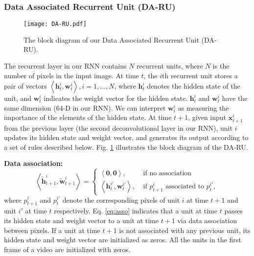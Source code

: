 \documentclass[conference]{IEEEtran}
\begin{document}
\subsubsection{Data Associated Recurrent Unit (DA-RU)}


\begin{figure}
	\centering
	\texttt{[image: DA-RU.pdf]}
	\caption{The block diagram of our Data Associated Recurrent Unit (DA-RU).}
	\label{fig:daru}
	\vspace{-4mm}
\end{figure}

The recurrent layer in our RNN contains $N$ recurrent units, where $N$ is the number of pixels in the input image. At time $t$, the $i$th recurrent unit stores a pair of vectors $\left< \mathbf{h}_t^i, \mathbf{w}_t^i \right>, i = 1,\ldots,N$, where $\mathbf{h}_t^i$ denotes the hidden state of the unit, and $\mathbf{w}_t^i$ indicates the weight vector for the hidden state. $\mathbf{h}_t^i$ and $\mathbf{w}_t^i$ have the same dimension (64-D in our RNN). We can interpret $\mathbf{w}_t^i$ as measuring the importance of the elements of the hidden state. At time $t + 1$, given input $\mathbf{x}_{t+1}^{i}$ from the previous layer (the second deconvolutional layer in our RNN), unit $i$ updates its hidden state and weight vector, and generates its output according to a set of rules described below. Fig. \ref{fig:daru} illustrates the block diagram of the DA-RU.

\textbf{Data association: }
\begin{equation} \label{eq:asso}
\left< \widetilde{\mathbf{h}}_{t+1}^{i}, \widetilde{\mathbf{w}}_{t+1}^{i} \right> = 
\left \{
\begin{aligned}
\left< \mathbf{0}, \mathbf{0} \right>, &\text{ if no association}\\
\left< \mathbf{h}_t^{i'}, \mathbf{w}_t^{i'} \right>, &\text{ if $p_{t+1}^i$ associated to $p_{t}^{i'}$},
\end{aligned} \right.
\end{equation}
where $p_{t+1}^i$ and $p_{t}^{i'}$ denote the corresponding pixels of unit $i$ at time $t+1$ and unit $i'$ at time $t$ respectively. Eq. \eqref{eq:asso} indicates that a unit at time $t$ passes its hidden state and weight vector to a unit at time $t+1$ via data association between pixels. If a unit at time $t+1$ is not associated with any previous unit, its hidden state and weight vector are initialized as zeros. All the units in the first frame of a video are initialized with zeros.
\end{document}
